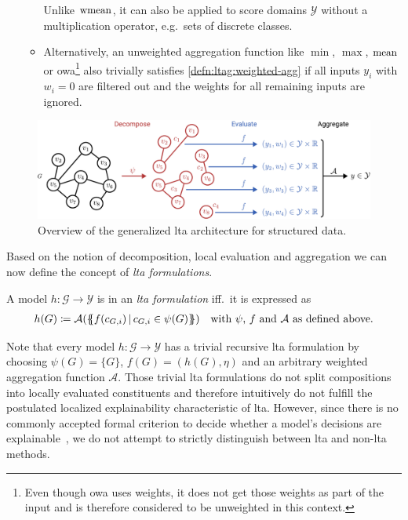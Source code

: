 \begin{enumerate}[label=\textbf{\arabic*.}]
\begin{itemize}
				Unlike $\operatorname{wmean}$, it can also be applied to score domains $\mathcal{Y}$ without a multiplication operator, e.g.\ sets of discrete classes.
			\item Alternatively, an unweighted aggregation function like $\min$, $\max$, $\operatorname{mean}$ or \ac{owa}\footnote{
				Even though \ac{owa} uses weights, it does not get those weights as part of the input and is therefore considered to be unweighted in this context.
			} also trivially satisfies \cref{defn:ltag:weighted-agg} if all inputs $y_i$ with $w_i = 0$ are filtered out and the weights for all remaining inputs are ignored.
		\end{itemize}
\end{enumerate}
\begin{figure}[ht]
	\centering
	\includegraphics[width=\linewidth]{gfx/graph-lta/ltag-overview.pdf}
	\caption{
		Overview of the generalized \ac{lta} architecture for structured data.
	}\label{fig:ltag:ltag-overview}
\end{figure}
Based on the notion of decomposition, local evaluation and aggregation we can now define the concept of \textit{\ac{lta} formulations}.
\begin{defn}\label{defn:ltag:formulation}
	A model $h: \mathcal{G} \to \mathcal{Y}$ is in an \textit{\ac{lta} formulation} iff.\ it is expressed as
	\begin{align*}
		h(G) \coloneqq \mathcal{A}(\ldblbrace f(c_{G,i})\, |\, c_{G,i} \in \psi(G) \rdblbrace) \quad\text{with $\psi$, $f$ and $\mathcal{A}$ as defined above.}
	\end{align*}
\end{defn}
Note that every model $h: \mathcal{G} \to \mathcal{Y}$ has a trivial recursive \ac{lta} formulation by choosing $\psi(G) = \{ G \}$, $f(G) = (h(G), \eta)$ and an arbitrary weighted aggregation function $\mathcal{A}$.
Those trivial \ac{lta} formulations do not split compositions into locally evaluated constituents and therefore intuitively do not fulfill the postulated localized explainability characteristic of \ac{lta}.
However, since there is no commonly accepted formal criterion to decide whether a model's decisions are explainable~\cite{Lipton2018}, we do not attempt to strictly distinguish between \ac{lta} and non-\acs{lta} methods.
